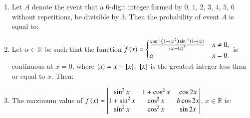 \documentclass[journal,12pt,onecolumn]{IEEEtran}
\theoremstyle{remark}
\begin{document}
\begin{enumerate}
\item Let $A$ denote the event that a $6$-digit integer formed by $0$, $1$, $2$, $3$, $4$, $5$, $6$ without repetitions, be divisible by $3$. Then the probability of event $A$ is equal to:

\hfill{}
\begin{enumerate}
\end{enumerate}

\item Let $\alpha \in \mathbb{R}$ be such that the function $f\left(x\right) = \begin{cases} \frac{\cos^{-1}\left(1-\left\{x\right\}^2\right)\sin^{-1}\left(1-\left\{x\right\}\right)}{\left\{x\right\}-\left\{x\right\}^3} & x\neq 0, \\\alpha & x=0 .\end{cases}$ is continuous at $x=0$, where $\left\{x\right\}=x-{}\left[x\right]$, ${}\left[x\right]$ is the greatest integer less than or equal to $x$. Then:

\hfill{}
\begin{enumerate}
\end{enumerate}

\item The maximum value of $f\left(x\right) = \begin{vmatrix}\sin^{2}x &1+\cos^{2}x & \cos 2x\\1+\sin^{2}x & \cos^{2}x & b \cos 2x\\\sin^{2}x & \cos^{2}x & \sin 2x\end{vmatrix}$, $x \in \mathbb{R}$ is:

\hfill{}
\begin{enumerate}
\end{enumerate}


\end{enumerate}
\end{document}
